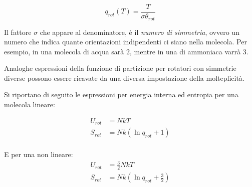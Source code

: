 \documentclass[oneside]{amsbook}
\numberwithin{section}{chapter}
\numberwithin{equation}{section}
\numberwithin{figure}{section}
\begin{document}
\begin{equation}
q_{rot}(T)=\frac{T}{\sigma\theta_{rot}}
\end{equation}

Il fattore $\sigma$ che appare al denominatore, è il 	\emph{numero di simmetria}, ovvero un numero che indica quante orientazioni indipendenti ci siano nella molecola. Per esempio, in una molecola di acqua sarà 2, mentre in una di ammoniaca varrà 3.

Analoghe espressioni della funzione di partizione per rotatori con simmetrie diverse possono essere ricavate da una diversa impostazione della molteplicità.

Si riportano di seguito le espressioni per energia interna ed entropia per una molecola lineare:

\begin{equation}
\begin{aligned}
U_{rot}&=NkT\\
S_{rot}&=Nk(\ln q_{rot}+1)\\
\end{aligned}
\end{equation}

E per una non lineare:
\begin{equation}
\begin{aligned}
U_{rot}&=\frac{3}{2}NkT\\
S_{rot}&=Nk(\ln q_{rot}+\frac{3}{2})\\
\end{aligned}
\end{equation}
\end{document}
